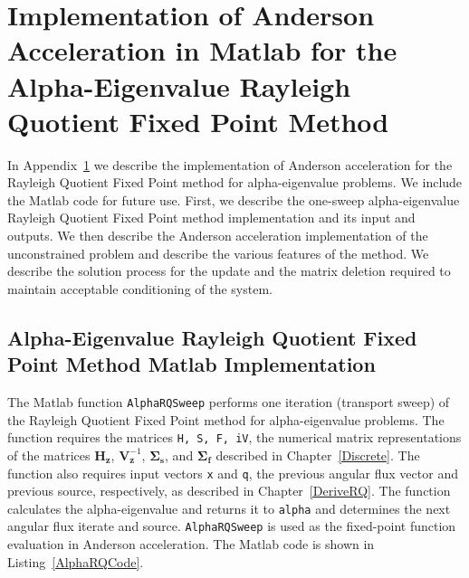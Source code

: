 \chapter[Implementation of Anderson Acceleration in Matlab for the Alpha-Eigenvalue Rayleigh Quotient Fixed Point Method][Anderson Acceleration Matlab Implementation]{Implementation of Anderson Acceleration in Matlab for the Alpha-Eigenvalue Rayleigh Quotient Fixed Point Method}

\label{AnderAccMATLAB}

In Appendix~\ref{AnderAccMATLAB} we describe the implementation of Anderson acceleration for the Rayleigh Quotient Fixed Point method for alpha-eigenvalue problems. We include the Matlab code for future use. First, we describe the one-sweep alpha-eigenvalue Rayleigh Quotient Fixed Point method implementation and its input and outputs. We then describe the Anderson acceleration implementation of the unconstrained problem and describe the various features of the method. We describe the solution process for the update and the matrix deletion required to maintain acceptable conditioning of the system.

\section{Alpha-Eigenvalue Rayleigh Quotient Fixed Point Method Matlab Implementation}

\label{sec:AlphaRQSweep}

The Matlab function \texttt{AlphaRQSweep} performs one iteration (transport sweep) of the Rayleigh Quotient Fixed Point method for alpha-eigenvalue problems. The function requires the matrices \texttt{H, S, F, iV}, the numerical matrix representations of the matrices $\mathbf{H}_{\mathbf{z}}$, $\mathbf{V}_{\mathbf{z}}^{-1}$, $\mathbf{\Sigma_{s}}$, and $\mathbf{\Sigma_{f}}$ described in Chapter~\ref{Discrete}. The function also requires input vectors \texttt{x} and \texttt{q}, the previous angular flux vector and previous source, respectively, as described in Chapter~\ref{DeriveRQ}. The function calculates the alpha-eigenvalue and returns it to \texttt{alpha} and determines the next angular flux iterate and source. \texttt{AlphaRQSweep} is used as the fixed-point function evaluation in Anderson acceleration. The Matlab code is shown in Listing~\ref{AlphaRQCode}.

\clearpage



